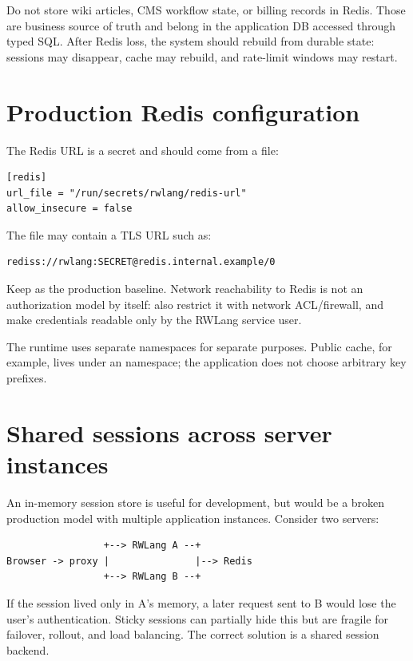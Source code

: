 Do not store wiki articles, CMS workflow state, or billing records in Redis. Those are business source of truth and belong in the application DB accessed through typed SQL. After Redis loss, the system should rebuild from durable state: sessions may disappear, cache may rebuild, and rate-limit windows may restart.

\section{Production Redis configuration}

The Redis URL is a secret and should come from a file:

\begin{lstlisting}
[redis]
url_file = "/run/secrets/rwlang/redis-url"
allow_insecure = false
\end{lstlisting}

The file may contain a TLS URL such as:

\begin{lstlisting}
rediss://rwlang:SECRET@redis.internal.example/0
\end{lstlisting}

Keep  as the production baseline. Network reachability to Redis is not an authorization model by itself: also restrict it with network ACL/firewall, and make credentials readable only by the RWLang service user.

The runtime uses separate namespaces for separate purposes. Public cache, for example, lives under an  namespace; the application does not choose arbitrary key prefixes.

\section{Shared sessions across server instances}

An in-memory session store is useful for development, but would be a broken production model with multiple application instances. Consider two servers:

\begin{lstlisting}
                 +--> RWLang A --+
Browser -> proxy |               |--> Redis
                 +--> RWLang B --+
\end{lstlisting}

If the session lived only in A's memory, a later request sent to B would lose the user's authentication. Sticky sessions can partially hide this but are fragile for failover, rollout, and load balancing. The correct solution is a shared session backend.


